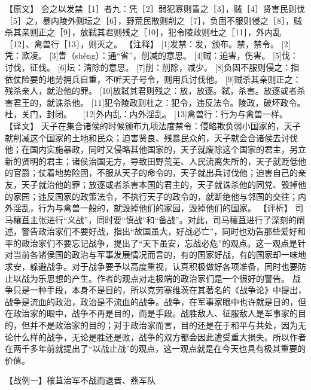 \documentclass[a4paper,12pt,UTF8,twoside]{ctexbook}
\begin{document}
【原文】
会之以发禁［1］者九：凭［2］弱犯寡则眚之［3］，贼［4］贤害民则伐［5］之，暴内陵外则坛之［6］，野荒民散则削之［7］，负固不服则侵之［8］，贼杀其亲则正之［9］，放弑其君则残之［10］，犯令陵政则杜之［11］，外内乱［12］、禽兽行［13］，则灭之。
【注释】
[1]发禁：发，颁布。禁，禁令。
[2]凭：欺凌。
[3]眚（shěng）：通“省”，削减的意思。
[4]贼：迫害，伤害。
[5]伐：讨伐，征伐。
[6]坛：清除的意思。
[7]削：削除，减少。
[8]负固不服则侵之：指依仗险要的地势拥兵自重，不听天子号令，则用兵讨伐他。
[9]贼杀其亲则正之：残杀亲人，就治他的罪。
[10]放弑其君则残之：放，放逐。弑，杀害。放逐或者杀害君王的，就诛杀他。
[11]犯令陵政则杜之：犯令，违反法令。陵政，破坏政令。杜，关门，封闭。
　[12]外内乱：内外淫乱。
[13]禽兽行：行为与禽兽一样。
【译文】
天子在集合诸侯的时候颁布九项法度禁令：侵略欺负弱小国家的，天子就削减这个国家的土地和民众；迫害贤良、残暴民众的，天子就会合诸侯去讨伐他；在国内实施暴政，同时又侵略其他国家的，天子就废除这个国家的君主，另立新的贤明的君主；诸侯治国无方，导致田野荒芜、人民流离失所的，天子就贬低他的官爵；仗着地势险固，不服从天子的命令的，天子就出兵讨伐他；迫害自己的亲友，天子就治他的罪；放逐或者杀害本国的君主的，天子就诛杀他的同党、毁掉他的家园；违反国家的政策法令，不执行天子的政令的，就断绝他与邻国的交往；内外淫乱，行为与禽兽一般的，就毁掉他们的家园，毁掉他们的国家。
【评析】
司马穰苴主张进行“义战”，同时要“慎战”和“备战”。对此，司马穰苴进行了深刻的阐述，警告政治家们不要好战，指出“故国虽大，好战必亡”，同时也劝告那些爱好和平的政治家们不要忘记战争，提出了“天下虽安，忘战必危”的观点。这一观点是针对当前各诸侯国的政治与军事发展情况而言的，有的国家好战，有的国家却一味地求安，躲避战争。对于战争要予以高度重视，认真积极做好各项准备，同时也要防止以战为乐思想的产生。作者的观点对走极端的政治家们是一个很好的警告。
战争只是一种手段，本身不是目的，所以克劳塞维茨在其著名的《战争论》中提出，战争是流血的政治，政治是不流血的战争。战争，在军事家眼中也许就是目的，但在政治家的眼中，战争不再是目的，而是手段。战胜敌人、征服敌人是军事家的目的，但并不是政治家的目的；对于政治家而言，目的还是在于和平与共处，因为无论什么样的战争，无论是胜还是败，战争的双方都会因此遭受重大损失。所以作者在两千多年前就提出了“以战止战”的观点，这一观点就是在今天也具有极其重要的价值。


【战例一】穰苴治军不战而退晋、燕军队
\end{document}
